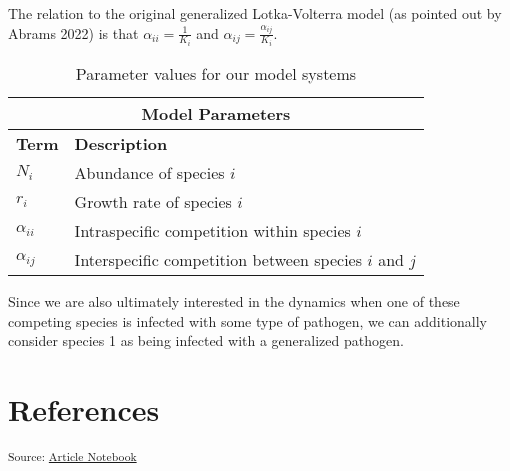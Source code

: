 \documentclass[
  letterpaper,
  DIV=11,
  numbers=noendperiod]{scrartcl}
\begin{document}
The relation to the original generalized Lotka-Volterra model (as
pointed out by Abrams 2022) is that \(\alpha_{ii} = \frac{1}{K_i}\) and
\(\alpha_{ij} = \frac{\alpha_{ij}}{K_i}\).

\begin{table}[hpt]
\centering
\begin{tabular}{ |m{4cm}||m{7cm}|}
     \hline
     \multicolumn{2}{|c|}{Model Parameters} \\
     \hline
     \textbf{Term} & \textbf{Description} \\
     \hline
     $N_i$ & Abundance of species $i$ \\
     $r_i$ & Growth rate of species $i$ \\
     $\alpha_{ii}$ & Intraspecific competition within species $i$ \\
     $\alpha_{ij}$ & Interspecific competition between species $i$ and $j$ \\
     \hline
\end{tabular}
\caption{Parameter values for our model systems}
\label{table:parameters}
\end{table}

Since we are also ultimately interested in the dynamics when one of
these competing species is infected with some type of pathogen, we can
additionally consider species 1 as being infected with a generalized
pathogen.

\section{References}

\textsubscript{Source:
\href{https://colebrookson.github.io/disease-overyield/index.qmd.html}{Article
Notebook}}
\end{document}
